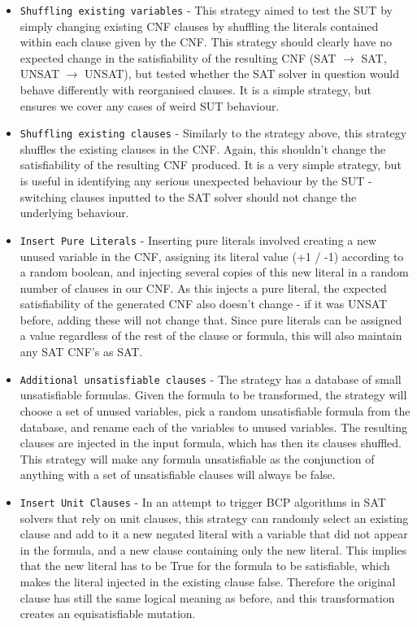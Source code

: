 \documentclass{article}
\begin{document}
\begin{itemize}

\item \verb|Shuffling existing variables| - This strategy aimed to test the SUT by simply changing existing CNF clauses by shuffling the literals contained within each clause given by the CNF. This strategy should clearly have no expected change in the satisfiability of the resulting CNF (SAT $\rightarrow$ SAT, UNSAT $\rightarrow$ UNSAT), but tested whether the SAT solver in question would behave differently with reorganised clauses. It is a simple strategy, but ensures we cover any cases of weird SUT behaviour.

\item \verb|Shuffling existing clauses| - Similarly to the strategy above, this strategy shuffles the existing clauses in the CNF. Again, this shouldn't change the satisfiability of the resulting CNF produced. It is a very simple strategy, but is useful in identifying any serious unexpected behaviour by the SUT - switching clauses inputted to the SAT solver should not change the underlying behaviour. 

\item \verb|Insert Pure Literals| - Inserting pure literals involved creating a new unused variable in the CNF, assigning its literal value (+1 / -1) according to a random boolean, and injecting several copies of this new literal in a random number of clauses in our CNF. As this injects a pure literal, the expected satisfiability of the generated CNF also doesn't change - if it was UNSAT before, adding these will not change that. Since pure literals can be assigned a value regardless of the rest of the clause or formula, this will also maintain any SAT CNF's as SAT.

\item \verb|Additional unsatisfiable clauses| - The strategy has a database of small unsatisfiable formulas.
Given the formula to be transformed, the strategy will choose a set of unused variables, pick a random
unsatisfiable formula from the database, and rename each of the variables to unused variables. The resulting
clauses are injected in the input formula, which has then its clauses shuffled.
This strategy will make any formula unsatisfiable as the conjunction of anything with a set of unsatisfiable
clauses will always be false.

\item \verb|Insert Unit Clauses| - In an attempt to trigger BCP algorithms in SAT solvers that rely on unit clauses,
this strategy can randomly select an existing clause and add to it a new negated literal with a variable that did
not appear in the formula, and a new clause containing only the new literal. This implies that the new
literal has to be True for the formula to be satisfiable, which makes the literal injected in the existing
clause false. Therefore the original clause has still the same logical meaning as before, and this transformation
creates an equisatisfiable mutation.

\end{itemize}
\end{document}
